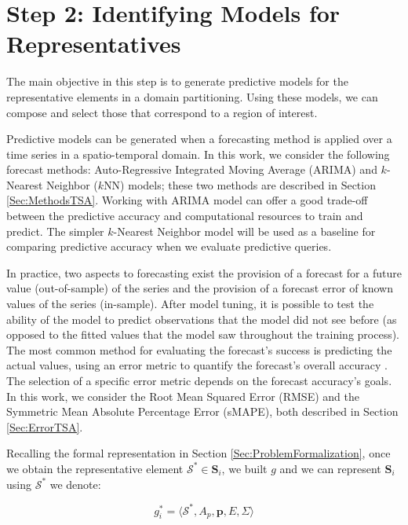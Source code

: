 \section{Step 2: Identifying Models for Representatives}
\label{Sec:ModelRepresentatives}

The main objective in this step is to generate predictive models for the representative elements in a domain partitioning. Using these models, we can compose and select those that correspond to a region of interest.

Predictive models can be generated when a forecasting method is applied over a time series in a spatio-temporal domain. In this work, we consider the following forecast methods: Auto-Regressive Integrated Moving Average (ARIMA) and $k$-Nearest Neighbor ($k$NN) models; these two methods are described in Section \ref{Sec:MethodsTSA}. Working with ARIMA model can offer a good trade-off between the predictive accuracy and computational resources to train and predict. The simpler $k$-Nearest Neighbor model will be used as a baseline for comparing predictive accuracy when we evaluate predictive queries.

In practice, two aspects to forecasting exist the provision of a forecast for a future value (out-of-sample) of the series and the provision of a forecast error of known values of the series (in-sample). After model tuning, it is possible to test the ability of the model to predict observations that the model did not see before (as opposed to the fitted values that the model saw throughout the training process). The most common method for evaluating the forecast's success is predicting the actual values, using an error metric to quantify the forecast's overall accuracy \cite{Hyndman2006}. The selection of a specific error metric depends on the forecast accuracy's goals. In this work, we consider the Root Mean Squared Error (RMSE) and the Symmetric Mean Absolute Percentage Error (sMAPE), both described in Section \ref{Sec:ErrorTSA}.

Recalling the formal representation in Section \ref{Sec:ProblemFormalization}, once we obtain the representative element $\mathcal{S}^{*} \in \mathbf{S}_{i}$, we built $g$ and we can represent $\mathbf{S}_{i}$ using $\mathcal{S}^{*}$ we denote:

\begin{equation}
g^{*}_{i} = \langle \mathcal{S}^{*}, A_p, \mathbf{p}, E, \varSigma \rangle
\end{equation}

